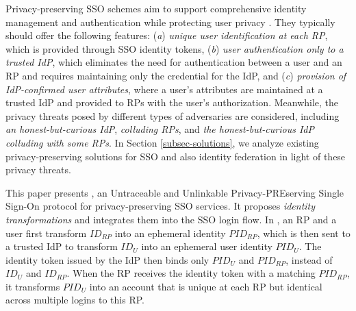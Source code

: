 Privacy-preserving SSO schemes aim to support comprehensive identity management and authentication
 while protecting user privacy \cite{maler2008venn, NIST2017draft, BrowserID, SPRESSO}.
They typically should offer the following features:
(\emph{a}) \emph{unique user identification at each RP}, which is provided through SSO identity tokens,
(\emph{b}) \emph{user authentication only to a trusted IdP},
 which eliminates the need for authentication between a user and an RP and requires maintaining only the credential for the IdP,
and (\emph{c}) \emph{provision of IdP-confirmed user attributes}, 
 where a user's attributes are maintained at a trusted IdP and provided to RPs with the user's authorization.
 Meanwhile, the privacy threats posed by different types of adversaries are considered, including \emph{an honest-but-curious IdP}, \emph{colluding RPs}, and \emph{the honest-but-curious IdP colluding with some RPs}.
In Section \ref{subsec-solutions}, we analyze existing privacy-preserving solutions for SSO and also identity federation in light of these privacy threats.


This paper presents \usso, an Untraceable and Unlinkable Privacy-PREserving Single Sign-On protocol for privacy-preserving SSO services. It proposes {\em identity transformations} and integrates them into the SSO login flow.
In \usso, an RP and a user first transform $ID_{RP}$ into an ephemeral identity $PID_{RP}$, which is then sent to a trusted IdP to transform $ID_U$ into an ephemeral user identity $PID_U$.
The identity token issued by the IdP then binds only $PID_U$ and $PID_{RP}$, instead of $ID_U$ and $ID_{RP}$. When the RP receives the identity token with a matching $PID_{RP}$, it transforms $PID_U$ into an account that is unique at each RP but identical across multiple logins to this RP.


